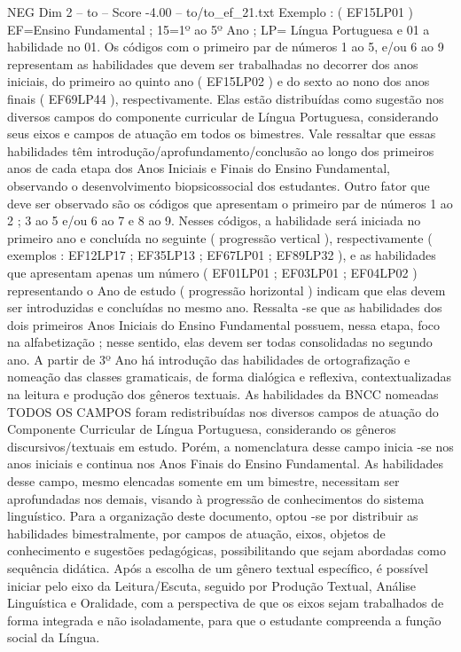 \begin{textsample}{NEG Dim 2 – to – Score -4.00 – to/to\_ef\_21.txt}
Exemplo : ( EF15LP01 ) EF=Ensino Fundamental ; 15=1º ao 5º Ano ; LP= Língua Portuguesa e 01 a habilidade no 01.
Os códigos com o primeiro par de números 1 ao 5, e/ou 6 ao 9 representam as habilidades que devem ser trabalhadas no decorrer dos anos iniciais, do primeiro ao quinto ano ( EF15LP02 ) e do sexto ao nono dos anos finais ( EF69LP44 ), respectivamente.
Elas estão distribuídas como sugestão nos diversos campos do componente curricular de Língua Portuguesa, considerando seus eixos e campos de atuação em todos os bimestres.
Vale ressaltar que essas habilidades têm introdução/aprofundamento/conclusão ao longo dos primeiros anos de cada etapa dos Anos Iniciais e Finais do Ensino Fundamental, observando o desenvolvimento biopsicossocial dos estudantes.
Outro fator que deve ser observado são os códigos que apresentam o primeiro par de números 1 ao 2 ; 3 ao 5 e/ou 6 ao 7 e 8 ao 9.
Nesses códigos, a habilidade será iniciada no primeiro ano e concluída no seguinte ( progressão vertical ), respectivamente ( exemplos : EF12LP17 ; EF35LP13 ; EF67LP01 ; EF89LP32 ), e as habilidades que apresentam apenas um número ( EF01LP01 ; EF03LP01 ; EF04LP02 ) representando o Ano de estudo ( progressão horizontal ) indicam que elas devem ser introduzidas e concluídas no mesmo ano.
Ressalta -se que as habilidades dos dois primeiros Anos Iniciais do Ensino Fundamental possuem, nessa etapa, foco na alfabetização ; nesse sentido, elas devem ser todas consolidadas no segundo ano.
A partir de 3º Ano há introdução das habilidades de ortografização e nomeação das classes gramaticais, de forma dialógica e reflexiva, contextualizadas na leitura e produção dos gêneros textuais.
As habilidades da BNCC nomeadas TODOS OS CAMPOS foram redistribuídas nos diversos campos de atuação do Componente Curricular de Língua Portuguesa, considerando os gêneros discursivos/textuais em estudo.
Porém, a nomenclatura desse campo inicia -se nos anos iniciais e continua nos Anos Finais do Ensino Fundamental.
As habilidades desse campo, mesmo elencadas somente em um bimestre, necessitam ser aprofundadas nos demais, visando à progressão de conhecimentos do sistema linguístico.
Para a organização deste documento, optou -se por distribuir as habilidades bimestralmente, por campos de atuação, eixos, objetos de conhecimento e sugestões pedagógicas, possibilitando que sejam abordadas como sequência didática.
Após a escolha de um gênero textual específico, é possível iniciar pelo eixo da Leitura/Escuta, seguido por Produção Textual, Análise Linguística e Oralidade, com a perspectiva de que os eixos sejam trabalhados de forma integrada e não isoladamente, para que o estudante compreenda a função social da Língua.

\end{textsample}
